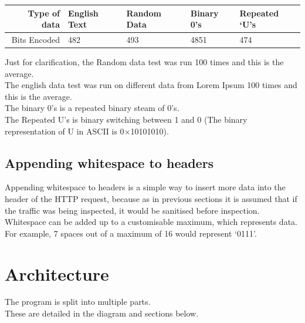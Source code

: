 \documentclass[12pt]{article}
\begin{document}
\begin{table}[ht]
\begin{tabular}{@{}rllll@{}}
\toprule
Type of data & English Text & Random Data & Binary 0's & Repeated `U's \\ \midrule
Bits Encoded & 482 & 493 & 4851 & 474 \\ \bottomrule
\end{tabular}
\end{table}
{\small * Just for clarification, the Random data test was run 100 times and this is the average.\\ The english data test was run on different data from Lorem Ipsum 100 times and this is the average. \\ The binary 0's is a repeated binary steam of 0's.\\ The Repeated U's is binary switching between 1 and 0 (The binary representation of U in ASCII is 0$\times$10101010).}

\newpage
\subsection{Appending whitespace to headers}
Appending whitespace to headers is a simple way to insert more data into the header of the HTTP request, because as in previous sections it is assumed that if the traffic was being inspected, it would be sanitised before inspection. \\
Whitespace can be added up to a customisable maximum, which represents data.
For example, 7 spaces out of a maximum of 16 would represent `0111'.

\section{Architecture}
The program is split into multiple parts.\\
These are detailed in the diagram and sections below.

\begin{center}
\end{center}
\end{document}
